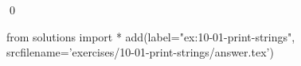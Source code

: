 
\begin{ex}
  \label{ex:10-01-print-strings}
  
  \qed
\end{ex}
\begin{python0}
from solutions import *
add(label="ex:10-01-print-strings",
    srcfilename='exercises/10-01-print-strings/answer.tex')
\end{python0}
